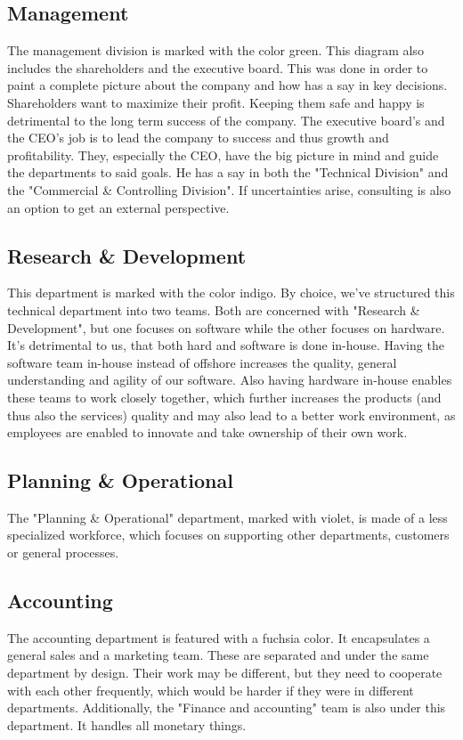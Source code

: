 \subsection{Management}\label{org-management}
The management division is marked with the color green. This diagram also includes the shareholders and the executive board. This was done in order to paint a complete picture about the company and how has a say in key decisions.
\newline
Shareholders want to maximize their profit. Keeping them safe and happy is detrimental to the long term success of the company.
\newline
The executive board's and the CEO's job is to lead the company to success and thus growth and profitability. They, especially the CEO, have the big picture in mind and guide the departments to said goals. He has a say in both the "Technical Division" and the "Commercial \& Controlling Division".
\newline
\newline
If uncertainties arise, consulting is also an option to get an external perspective.
\subsection{Research \& Development}
This department is marked with the color indigo.
\newline
By choice, we've structured this technical department into two teams. Both are concerned with "Research \& Development", but one focuses on software while the other focuses on hardware. It's detrimental to us, that both hard and software is done in-house. Having the software team in-house instead of offshore increases the quality, general understanding and agility of our software. Also having hardware in-house enables these teams to work closely together, which further increases the products (and thus also the services) quality and may also lead to a better work environment, as employees are enabled to innovate and take ownership of their own work. \cite{wang_2022_employee}
\subsection{Planning \& Operational}
The "Planning \& Operational" department, marked with violet, is made of a less specialized workforce, which focuses on supporting other departments, customers or general processes.
\subsection{Accounting}
The accounting department is featured with a fuchsia color. It encapsulates a general sales and a marketing team. These are separated and under the same department by design. Their work may be different, but they need to cooperate with each other frequently, which would be harder if they were in different departments.
Additionally, the "Finance and accounting" team is also under this department. It handles all monetary things.
